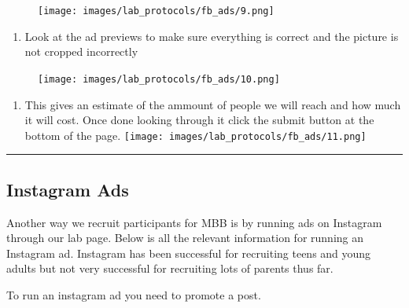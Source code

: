 \documentclass[
]{book}
\providecommand{\tightlist}{%
  \setlength{\itemsep}{0pt}\setlength{\parskip}{0pt}}
\begin{document}
\begin{figure}
\centering
\texttt{[image: images/lab\_protocols/fb\_ads/9.png]}
\caption{}
\end{figure}

\begin{enumerate}
\def\labelenumi{\arabic{enumi}.}
\setcounter{enumi}{9}
\tightlist
\item
  Look at the ad previews to make sure everything is correct and the picture is not cropped incorrectly
\end{enumerate}

\begin{figure}
\centering
\texttt{[image: images/lab\_protocols/fb\_ads/10.png]}
\caption{}
\end{figure}

\begin{enumerate}
\def\labelenumi{\arabic{enumi}.}
\setcounter{enumi}{10}
\tightlist
\item
  This gives an estimate of the ammount of people we will reach and how much it will cost. Once done looking through it click the submit button at the bottom of the page.
  \texttt{[image: images/lab\_protocols/fb\_ads/11.png]}
\end{enumerate}

\begin{center}\rule{0.5\linewidth}{0.5pt}\end{center}

\hypertarget{instagram-ads}{%
\subsection{Instagram Ads}\label{instagram-ads}}

Another way we recruit participants for MBB is by running ads on Instagram through our lab page. Below is all the relevant information for running an Instagram ad. Instagram has been successful for recruiting teens and young adults but not very successful for recruiting lots of parents thus far.

To run an instagram ad you need to promote a post.
\end{document}
